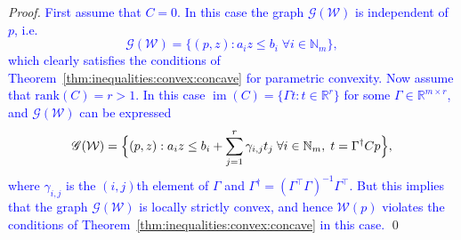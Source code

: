 \documentclass[smallextended]{svjour3}       %
\numberwithin{equation}{section}
\DeclareMathOperator{\rank}{rank}
\DeclareMathOperator{\image}{im}
\newcommand{\revision}[1]{\textcolor{blue}{#1}}
\begin{document}
\begin{proof}
\revision{First assume that $C=0$. In this case the graph $\mathscr G(\mathcal W)$ is independent of $p$, i.e.
%
\begin{equation*}
	\mathscr G(\mathcal W) = \{(p,z):a_i z\leq b_i \; \forall i\in\mathbb N_m\},
\end{equation*}
%
which clearly satisfies the  conditions of Theorem~\ref{thm:inequalities:convex:concave}
for parametric convexity.
%
%
Now assume that $\text{rank}(C)=r> 1$. In this case $\image(C) = \{\Gamma t : t \in \mathbb R^r\}$ for  some $\Gamma \in\mathbb{R}^{m\times r}$,
  and $\mathscr{G}(\mathcal W)$ can be expressed
\begin{equation*}
  \mathscr G(\mathcal W) = \Bigl\{(p,z) : a_i z \leq b_i + \sum_{j=1}^r \gamma_{i,j} t_j \; \forall i\in\mathbb N_m,\; t =\Gamma^\dagger Cp \Bigr\},
\end{equation*}
%
where $\gamma_{i,j}$ is the $(i,j)$th element of $\Gamma$ and $\Gamma^\dagger = (\Gamma^\top\Gamma)^{-1}\Gamma^\top$.
%
But this implies that the graph $\mathscr G(\mathcal W)$ is locally strictly convex, and hence $\mathcal W(p)$ violates the conditions of Theorem~\ref{thm:inequalities:convex:concave} in this case.}
\qed
\end{proof}
%
\end{document}
